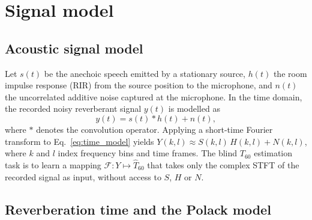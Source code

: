 \documentclass[a4paper,fleqn]{cas-dc}
\begin{document}
\section{Signal model}\label{sec:bg}

\subsection{Acoustic signal model}\label{sec:bg:signal}

Let $s(t)$ be the anechoic speech emitted by a stationary source,
$h(t)$ the room impulse response (RIR) from the source position to the
microphone, and $n(t)$ the uncorrelated additive noise captured at the
microphone. In the time domain, the recorded noisy reverberant signal
$y(t)$ is modelled as
\begin{equation}\label{eq:time_model}
  y(t) = s(t)\ast h(t) + n(t),
\end{equation}
where $\ast$ denotes the convolution operator. Applying a short-time
Fourier transform to Eq.~\eqref{eq:time_model} yields
$Y(k,l) \approx S(k,l)\,H(k,l) + N(k,l)$, where $k$ and $l$ index
frequency bins and time frames. The blind $T_{60}$ estimation task is to
learn a mapping $\mathcal{F}:Y \mapsto \hat{T}_{60}$ that takes only the
complex STFT of the recorded signal as input, without access to $S$,
$H$ or $N$.

\subsection{Reverberation time and the Polack model}\label{sec:bg:rt}
\end{document}

